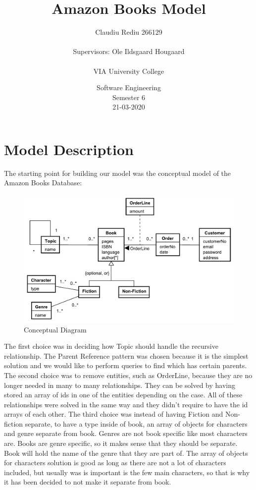 \documentclass{article}
\title{\Huge Amazon Books Model}
\date{Software Engineering \\  Semester 6 \\  21-03-2020}
\author{Claudiu Rediu 266129\\ \\  Supervisors: Ole Ildsgaard Hougaard\\ \\ VIA University College}
\begin{document}
	\maketitle
	\newpage
	\newpage
	\section*{Model Description}
	The starting point for building our model was the conceptual model of the Amazon Books Database:\newline
	\begin{figure}[h!]
		\includegraphics[width=\linewidth]{ConceptualModel.pdf}
		\caption{Conceptual Diagram}
		\label{fig:conceptual}
	\end{figure}
	\newline
	The first choice was in deciding how Topic should handle the recursive relationship. The Parent Reference pattern was chosen because it is the simplest solution and we would like to perform queries to find which has certain parents. \newline
	The second choice was to remove entities, such as OrderLine, because they are no longer needed in many to many relationships. They can be solved by having stored an array of ids in one of the entities depending on the case. All of these relationships were solved in the same way and they didn't require to have the id arrays of each other. \newline
	The third choice was instead of having Fiction and Non-fiction separate, to have a type inside of book, an array of objects for characters and genre separate from book. Genres are not book specific like most characters are. Books are genre specific, so it makes sense that they should be separate. Book will hold the name of the genre that they are part of. The array of objects for characters solution is good as long as there are not a lot of characters included, but usually was is important is the few main characters, so that is why it has been decided to not make it separate from book. \newline
\end{document}
